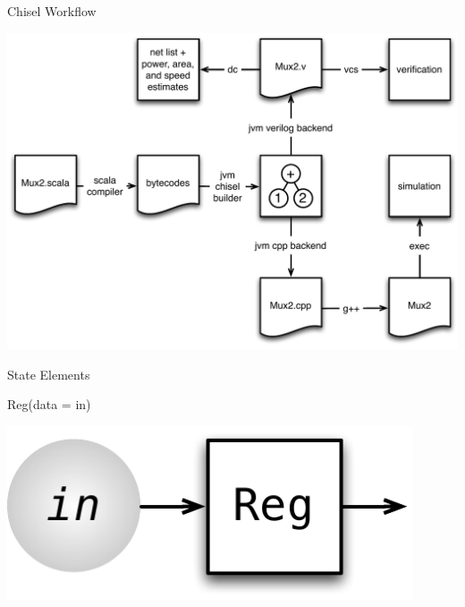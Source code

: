 \documentclass[xcolor=pdflatex,dvipsnames,table]{beamer}
\begin{document}
\begin{frame}{Chisel Workflow}
\begin{center}
\includegraphics[height=0.9\textheight]{../bootcamp/figs/chisel-workflow.pdf}
\end{center}
\end{frame}



\begin{frame}[fragile]{State Elements}

\begin{scala}
Reg(data = in)
\end{scala}

\begin{center}
\includegraphics[width=0.9\textwidth]{figs/reg-in.pdf} 
\end{center}

\end{frame}
\end{document}

